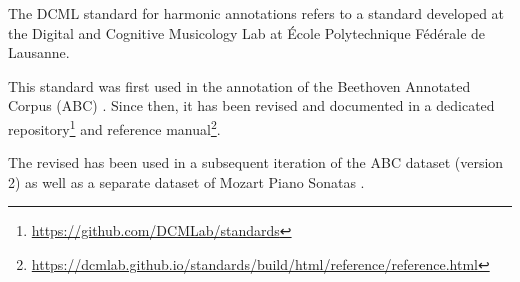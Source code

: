 The DCML standard for harmonic annotations refers to a
standard developed at the Digital and Cognitive Musicology
Lab at \'Ecole Polytechnique F\'ed\'erale de Lausanne.

This standard was first used in the annotation of the
Beethoven Annotated Corpus (ABC)
\parencite{neuwirth2018annotated}. Since then, it has been
revised and documented in a dedicated
repository\footnote{\href{https://github.com/DCMLab/standards}{https://github.com/DCMLab/standards}}
and reference
manual\footnote{\href{https://dcmlab.github.io/standards/build/html/reference/reference.html}{https://dcmlab.github.io/standards/build/html/reference/reference.html}}.

The revised has been used in a subsequent iteration of the
ABC dataset (version 2) as well as a separate dataset of
Mozart Piano Sonatas \parencite{hentschel2021annotated}.
